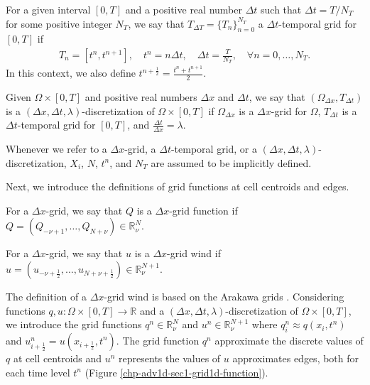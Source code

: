 \begin{definition}
	For a given interval $[0,T]$ and a positive real number $\Delta t$ such that $\Delta t = T/N_T$
    for some positive integer $N_T$, we say that  $T_{\Delta T}= \{T_n\}_{n=0}^{N_T}$ a $\Delta t$-temporal grid for $[0,T]$ if
    \begin{align*}
	T_n = [t^n, t^{n+1}], \quad t^n = n\Delta t, \quad \Delta t = \frac{T}{N_T}, \quad \forall n = 0, \ldots, N_T.
    \end{align*}
    In this context, we also define $t^{n+\frac{1}{2}} = \frac{t^n+t^{n+1}}{2}$.
\end{definition}

\begin{definition}
\label{chp-adv1d-def-dxtimegrid}
	Given $\Omega \times [0,T]$ and positive real numbers $\Delta x$ and $\Delta t$,
    we say that $(\Omega_{\Delta x}, T_{\Delta t})$ is a $(\Delta x, \Delta t, \lambda)$-discretization 
    of $\Omega \times [0,T]$ if $\Omega_{\Delta x}$ is a $\Delta x$-grid for $\Omega$, 
    ${T}_{\Delta t}$ is a $\Delta t$-temporal grid for $[0,T]$, and $\frac{\Delta t}{\Delta x} = \lambda$.
\end{definition}
\begin{remark}
	Whenever we refer to a $\Delta x$-grid, a $\Delta t$-temporal grid, or a $(\Delta x, \Delta t, \lambda)$-discretization, 
	$X_i$, $N$, $t^n$, and $N_T$ are assumed to be implicitly defined.
\end{remark}
Next, we introduce the definitions of grid functions at cell centroids and edges.
\begin{definition}
	For a $\Delta x$-grid, we say that $Q$ is a $\Delta x$-grid function if
	$Q = (Q_{-\nu+1}, \ldots, Q_{N+\nu}) \in \mathbb{R}^{N}_{\nu}$.
\end{definition}
\begin{definition}
	For a $\Delta x$-grid, we say that $u$ is a $\Delta x$-grid wind if
	$u = (u_{-\nu+\frac{1}{2}}, \ldots, u_{N+\nu+\frac{1}{2}}) \in \mathbb{R}^{N+1}_{\nu}$.
\end{definition}
The definition of a $\Delta x$-grid wind is based on the Arakawa grids \citep{arakawa:1977}.
Considering functions $q, u: \Omega \times[0,T] \to \mathbb{R}$ and a $(\Delta x,\Delta t, \lambda)$-discretization
of $\Omega \times[0,T]$, we introduce the grid functions $q^n \in \mathbb{R}^{N}_{\nu}$ and $u^n \in \mathbb{R}^{N+1}_{\nu}$
where ${q}^n_{i} \approx {q}(x_i, t^{n})$ and $u^n_{i+\frac{1}{2}} = u(x_{i+\frac{1}{2}},t^n)$.
The grid function $q^n$ approximate the discrete values of $q$ at cell centroids and $u^n$ represents the values of $u$ approximates edges, both
for each time level $t^n$ (Figure \ref{chp-adv1d-sec1-grid1d-function}).


